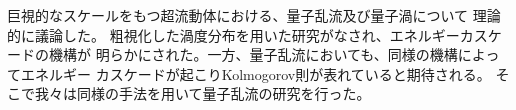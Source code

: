 \documentclass[12pt,a4paper]{jbook}
\begin{document}
\setcounter{page}{1}
\normalsize
巨視的なスケールをもつ超流動体における、量子乱流及び量子渦について
理論的に議論した。
粗視化した渦度分布を用いた研究がなされ、エネルギーカスケードの機構が
明らかにされた。一方、量子乱流においても、同様の機構によってエネルギー
カスケードが起こりKolmogorov則が表れていると期待される。
そこで我々は同様の手法を用いて量子乱流の研究を行った。
\end{document}
